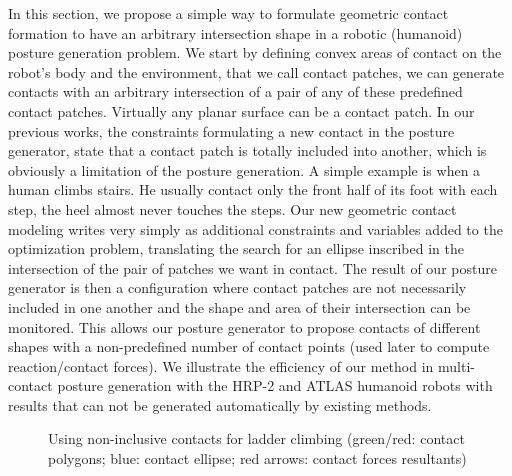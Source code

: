 In this section, we propose a simple way to formulate geometric contact formation to have an arbitrary intersection shape in a robotic (humanoid) posture generation problem.
We start by defining convex areas of contact on the robot's body and the environment, that we call contact patches, we can generate contacts with an arbitrary intersection of a pair of any of these predefined contact patches.
Virtually any planar surface can be a contact patch.
In our previous works, the constraints formulating a new contact in the posture generator, state that a contact patch is totally included into another, which is obviously a limitation of the posture generation.
A simple example is when a human climbs stairs. He usually contact only the front half of its foot with each step, the heel almost never touches the steps.
Our new geometric contact modeling writes very simply as additional constraints and variables added to the optimization problem, translating the search for an ellipse inscribed in the intersection of the pair of patches we want in contact.
The result of our posture generator is then a configuration where contact patches are not necessarily included in one another and the shape and area of their intersection can be monitored.
This allows our posture generator to propose contacts of different shapes with a non-predefined number of contact points (used later to compute reaction/contact forces).
We illustrate the efficiency of our method in multi-contact posture generation with the HRP-2 and ATLAS humanoid robots with results that can not be generated automatically by existing methods.

\begin{figure}
\centering
  \centering
  \setlength\fboxsep{0pt}
  \setlength\fboxrule{1pt}
\caption{Using non-inclusive contacts for ladder climbing (green/red: contact polygons; blue: contact ellipse; red arrows: contact forces resultants)}
\label{fig:hrp2_jrl_complete}
\end{figure}

